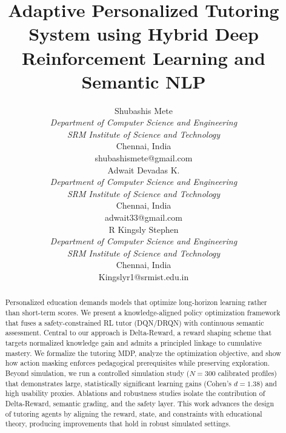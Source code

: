 \documentclass[conference]{IEEEtran}
\begin{document}
\title{Adaptive Personalized Tutoring System using Hybrid Deep Reinforcement Learning and Semantic NLP}

\author{
\begin{minipage}[t]{0.30\textwidth}\centering
Shubashis Mete\\
\textit{Department of Computer Science and Engineering}\\
\textit{SRM Institute of Science and Technology}\\
Chennai, India\\
shubashismete@gmail.com
\end{minipage}\hfill
\begin{minipage}[t]{0.30\textwidth}\centering
Adwait Devadas K.\\
\textit{Department of Computer Science and Engineering}\\
\textit{SRM Institute of Science and Technology}\\
Chennai, India\\
adwait33@gmail.com
\end{minipage}\hfill
\begin{minipage}[t]{0.30\textwidth}\centering
R Kingsly Stephen\\
\textit{Department of Computer Science and Engineering}\\
\textit{SRM Institute of Science and Technology}\\
Chennai, India\\
Kingslyr1@srmist.edu.in
\end{minipage}
}

\maketitle

\begin{abstract}
Personalized education demands models that optimize long-horizon learning rather than short-term scores. We present a knowledge-aligned policy optimization framework that fuses a safety-constrained RL tutor (DQN/DRQN) with continuous semantic assessment. Central to our approach is Delta-Reward, a reward shaping scheme that targets normalized knowledge gain and admits a principled linkage to cumulative mastery. We formalize the tutoring MDP, analyze the optimization objective, and show how action masking enforces pedagogical prerequisites while preserving exploration. Beyond simulation, we run a controlled simulation study ($N=300$ calibrated profiles) that demonstrates large, statistically significant learning gains (Cohen’s $d=1.38$) and high usability proxies. Ablations and robustness studies isolate the contribution of Delta-Reward, semantic grading, and the safety layer. This work advances the design of tutoring agents by aligning the reward, state, and constraints with educational theory, producing improvements that hold in robust simulated settings.
\end{abstract}
\end{document}
